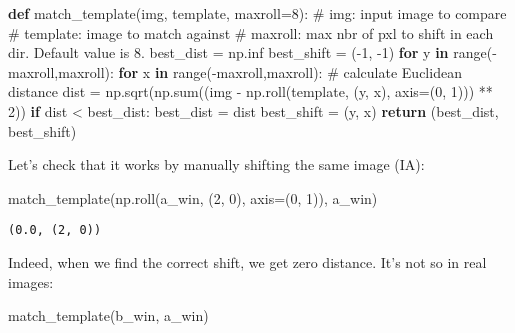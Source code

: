 \documentclass[
  english,
  letterpaper,
  numbers=noendperiod,
  DIV=13]{scrreprt}
\newenvironment{Shaded}{\begin{snugshade}}{\end{snugshade}}
\newcommand{\BuiltInTok}[1]{\textcolor[rgb]{0.00,0.23,0.31}{#1}}
\newcommand{\CommentTok}[1]{\textcolor[rgb]{0.37,0.37,0.37}{#1}}
\newcommand{\ControlFlowTok}[1]{\textcolor[rgb]{0.00,0.23,0.31}{\textbf{#1}}}
\newcommand{\DecValTok}[1]{\textcolor[rgb]{0.68,0.00,0.00}{#1}}
\newcommand{\KeywordTok}[1]{\textcolor[rgb]{0.00,0.23,0.31}{\textbf{#1}}}
\newcommand{\NormalTok}[1]{\textcolor[rgb]{0.00,0.23,0.31}{#1}}
\newcommand{\OperatorTok}[1]{\textcolor[rgb]{0.37,0.37,0.37}{#1}}
\begin{document}
\begin{Shaded}
\begin{Highlighting}[]
\KeywordTok{def}\NormalTok{ match\_template(img, template, maxroll}\OperatorTok{=}\DecValTok{8}\NormalTok{):}
    \CommentTok{\# img: input image to compare}
    \CommentTok{\# template: image to match against}
    \CommentTok{\# maxroll: max nbr of pxl to shift in each dir. Default value is 8.}
\NormalTok{    best\_dist }\OperatorTok{=}\NormalTok{ np.inf}
\NormalTok{    best\_shift }\OperatorTok{=}\NormalTok{ (}\OperatorTok{{-}}\DecValTok{1}\NormalTok{, }\OperatorTok{{-}}\DecValTok{1}\NormalTok{)}
    \ControlFlowTok{for}\NormalTok{ y }\KeywordTok{in} \BuiltInTok{range}\NormalTok{(}\OperatorTok{{-}}\NormalTok{maxroll,maxroll):}
        \ControlFlowTok{for}\NormalTok{ x }\KeywordTok{in} \BuiltInTok{range}\NormalTok{(}\OperatorTok{{-}}\NormalTok{maxroll,maxroll):}
            \CommentTok{\# calculate Euclidean distance}
\NormalTok{            dist }\OperatorTok{=}\NormalTok{ np.sqrt(np.}\BuiltInTok{sum}\NormalTok{((img }\OperatorTok{{-}}\NormalTok{ np.roll(template, (y, x), axis}\OperatorTok{=}\NormalTok{(}\DecValTok{0}\NormalTok{, }\DecValTok{1}\NormalTok{))) }\OperatorTok{**} \DecValTok{2}\NormalTok{))}
            \ControlFlowTok{if}\NormalTok{ dist }\OperatorTok{\textless{}}\NormalTok{ best\_dist:}
\NormalTok{                best\_dist }\OperatorTok{=}\NormalTok{ dist}
\NormalTok{                best\_shift }\OperatorTok{=}\NormalTok{ (y, x)}
    \ControlFlowTok{return}\NormalTok{ (best\_dist, best\_shift)}
\end{Highlighting}
\end{Shaded}

Let's check that it works by manually shifting the same image (IA):

\begin{Shaded}
\begin{Highlighting}[]
\NormalTok{match\_template(np.roll(a\_win, (}\DecValTok{2}\NormalTok{, }\DecValTok{0}\NormalTok{), axis}\OperatorTok{=}\NormalTok{(}\DecValTok{0}\NormalTok{, }\DecValTok{1}\NormalTok{)), a\_win)}
\end{Highlighting}
\end{Shaded}

\begin{verbatim}
(0.0, (2, 0))
\end{verbatim}

Indeed, when we find the correct shift, we get zero distance. It's not
so in real images:

\begin{Shaded}
\begin{Highlighting}[]
\NormalTok{match\_template(b\_win, a\_win)}
\end{Highlighting}
\end{Shaded}
\end{document}
